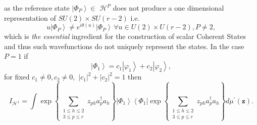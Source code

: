 \documentclass[aps,preprint]{revtex4}%
\begin{document}
as the reference state $\left\vert \Phi_{P}\right\rangle \in$ $\mathcal{H}%
^{P}$ does not produce a one dimensional representation of $SU\left(
2\right)  \times SU\left(  r-2\right)  $ i.e.
\begin{equation}
u\left\vert \Phi_{P}\right\rangle \neq e^{i\theta\left(  u\right)  }\left\vert
\Phi_{P}\right\rangle \,\forall u\in U\left(  2\right)  \times U\left(
r-2\right)  ,P\neq2,
\end{equation}
which is \emph{the essential} ingredient for the construction of scalar
Coherent States and thus such wavefunctions do not uniquely represent the
states. In the case $P=1$ if
\begin{equation}
\left\vert \Phi_{1}\right\rangle =c_{1}\left\vert \varphi_{1}\right\rangle
+c_{2}\left\vert \varphi_{2}\right\rangle ,
\end{equation}
for fixed $c_{1}\neq0,c_{2}\neq0,$ $\left\vert c_{1}\right\vert ^{2}%
+\left\vert c_{2}\right\vert ^{2}=1$ then
\begin{equation}
I_{\mathcal{H}^{1}}=\int\exp\left\{  \sum\limits_{\substack{1\leq
h\leq2\\3\leq p\leq r}}z_{ph}a_{p}^{\dagger}a_{h}\right\}  \left\vert \Phi
_{1}\right\rangle \left\langle \Phi_{1}\right\vert \exp\left\{  \sum
\limits_{\substack{1\leq h\leq2\\3\leq p\leq r}}z_{ph}a_{p}^{\dagger}%
a_{h}\right\}  d\mu^{\prime}\left(  \mathbf{z}\right)  .
\end{equation}
\end{document}
